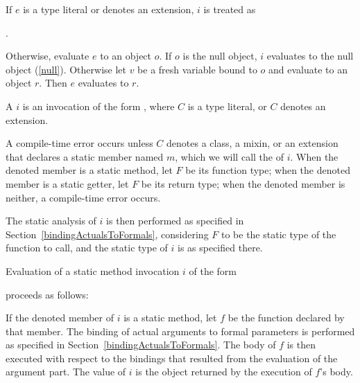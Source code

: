 \documentclass[makeidx]{article}
\begin{document}
{\LMHash{}%
If $e$ is a type literal or denotes an extension, $i$ is treated as

\noindent
{}.

\LMHash{}%
Otherwise, evaluate $e$ to an object $o$.
If $o$ is the null object, $i$ evaluates to the null object (\ref{null}).
Otherwise let $v$ be a fresh variable bound to $o$ and evaluate
to an object $r$.
Then $e$ evaluates to $r$.
\EndCase

\LMHash{}%
A 
$i$ is an invocation of the form
,
where $C$ is a type literal, or $C$ denotes an extension.


\LMHash{}%
A compile-time error occurs
unless $C$ denotes a class, a mixin, or an extension that declares
a static member named $m$,
which we will call the
of $i$.
When the denoted member is a static method, let $F$ be its function type;
when the denoted member is a static getter, let $F$ be its return type;
when the denoted member is neither, a compile-time error occurs.

\LMHash{}%
The static analysis of $i$ is then performed
as specified in Section~\ref{bindingActualsToFormals},
considering $F$ to be the static type of the function to call,
and the static type of $i$ is as specified there.

\LMHash{}%
Evaluation of a static method invocation $i$ of the form

\noindent
{}

\noindent
proceeds as follows:

\LMHash{}%
If the denoted member of $i$ is a static method,
let $f$ be the function declared by that member.
The binding of actual arguments to formal parameters is performed
as specified in Section~\ref{bindingActualsToFormals}.
The body of $f$ is then executed with respect to the bindings
that resulted from the evaluation of the argument part.
The value of $i$ is the object returned by the execution of $f$'s body.

}
\end{document}
